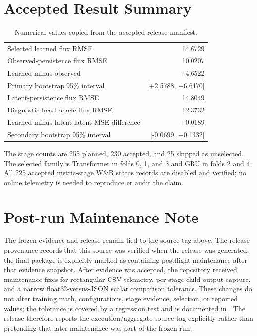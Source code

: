\section{Accepted Result Summary}

\begin{table}[htbp]
  \centering
  \caption{Numerical values copied from the accepted release manifest.}
  \label{tab:release-summary}
  \small
  \begin{tabular}{lr}
    \toprule
    Selected learned flux RMSE & 14.6729 \\
    Observed-persistence flux RMSE & 10.0207 \\
    Learned minus observed & +4.6522 \\
    Primary bootstrap 95\% interval & [+2.5788, +6.6470] \\
    Latent-persistence flux RMSE & 14.8049 \\
    Diagnostic-head oracle flux RMSE & 12.3732 \\
    Learned minus latent latent-MSE difference & +0.0189 \\
    Secondary bootstrap 95\% interval & [-0.0699, +0.1332] \\
    \bottomrule
  \end{tabular}
\end{table}

The stage counts are 255 planned, 230 accepted, and 25 skipped as unselected. The selected family
is Transformer in folds 0, 1, and 3 and GRU in folds 2 and 4. All 225 accepted metric-stage W\&B
status records are disabled and verified; no online telemetry is needed to reproduce or audit the
claim.

\section{Post-run Maintenance Note}

The frozen evidence and release remain tied to the source tag above. The release provenance records
that this source was verified when the release was generated; the final package is explicitly marked
as containing postflight maintenance after that evidence snapshot. After evidence was accepted,
the repository received maintenance fixes for rectangular CSV telemetry, per-stage child-output
capture, and a narrow float32-versus-JSON scalar comparison tolerance. These changes do not alter
training math, configurations, stage evidence, selection, or reported values; the tolerance is
covered by a regression test and is documented in . The release
therefore reports the execution/aggregate source tag explicitly rather than pretending that later
maintenance was part of the frozen run.

